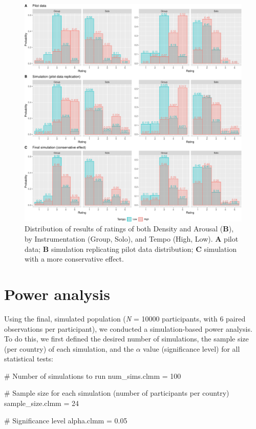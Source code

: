 \documentclass[
  bookmarksnumbered]{article}
\newenvironment{Shaded}{\begin{snugshade}}{\end{snugshade}}
\newcommand{\CommentTok}[1]{\textcolor[rgb]{0.50,0.62,0.50}{#1}}
\newcommand{\DecValTok}[1]{\textcolor[rgb]{0.86,0.86,0.80}{#1}}
\newcommand{\FloatTok}[1]{\textcolor[rgb]{0.75,0.75,0.82}{#1}}
\newcommand{\NormalTok}[1]{\textcolor[rgb]{0.80,0.80,0.80}{#1}}
\newcommand{\OtherTok}[1]{\textcolor[rgb]{0.94,0.94,0.56}{#1}}
\begin{document}
\begin{figure}
\centering
\includegraphics{Power_analysis_files/figure-latex/unnamed-chunk-8-1.pdf}
\caption{\label{fig:unnamed-chunk-8}Distribution of results of ratings of both Density and Arousal (\textbf{B}), by Instrumentation (Group, Solo), and Tempo (High, Low). \textbf{A} pilot data; \textbf{B} simulation replicating pilot data distribution; \textbf{C} simulation with a more conservative effect.}
\end{figure}

\hypertarget{power-analysis}{%
\section{Power analysis}\label{power-analysis}}

Using the final, simulated population (\emph{N} = 10000 participants, with 6 paired observations per participant), we conducted a simulation-based power analysis. To do this, we first defined the desired number of simulations, the sample size (per country) of each simulation, and the \(\alpha\) value (significance level) for all statistical tests:

\begin{Shaded}
\begin{Highlighting}[]
\CommentTok{\# Number of simulations to run}
\NormalTok{num\_sims.clmm }\OtherTok{=} \DecValTok{100} 

\CommentTok{\# Sample size for each simulation (number of participants per country)}
\NormalTok{sample\_size.clmm }\OtherTok{=} \DecValTok{24} 

\CommentTok{\# Significance level}
\NormalTok{alpha.clmm }\OtherTok{=} \FloatTok{0.05} 
\end{Highlighting}
\end{Shaded}
\end{document}
